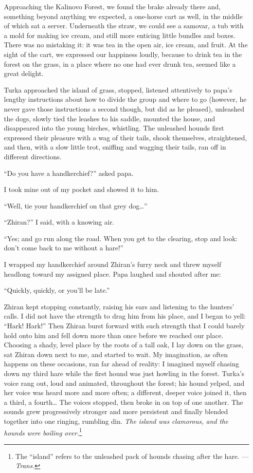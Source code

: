 Approaching the Kalinovo Forest, we found the brake already there and, something beyond anything we expected, a one-horse cart as well, in the middle of which sat a server. Underneath the straw, we could see a samovar, a tub with a mold for making ice cream, and still more enticing little bundles and boxes. There was no mistaking it: it was tea in the open air, ice cream, and fruit. At the sight of the cart, we expressed our happiness loudly, because to drink tea in the forest on the grass, in a place where no one had ever drunk tea, seemed like a great delight.

Turka approached the island of grass, stopped, listened attentively to papa's lengthy instructions about how to divide the group and where to go (however, he never gave those instructions a second though, but did as he pleased), unleashed the dogs, slowly tied the leashes to his saddle, mounted the house, and disappeared into the young birches, whistling. The unleashed hounds first expressed their pleasure with a wag of their tails, shook themselves, straightened, and then, with a slow little trot, sniffing and wagging their tails, ran off in different directions.

``Do you have a handkerchief?'' asked papa. %

I took mine out of my pocket and showed it to him.

``Well, tie your handkerchief on that grey dog\ldots{}'' %

``Zhiran?'' I said, with a knowing air. %

``Yes; and go run along the road. When you get to the clearing, stop and look: don't come back to me without a hare!'' %

I wrapped my handkerchief around Zhiran's furry neck and threw myself headlong toward my assigned place. Papa laughed and shouted after me:

``Quickly, quickly, or you'll be late.'' %

Zhiran kept stopping constantly, raising his ears and listening to the hunters' calls. I did not have the strength to drag him from his place, and I began to yell: ``Hark! Hark!'' Then Zhiran burst forward with such strength that I could barely hold onto him and fell down more than once before we reached our place. Choosing a shady, level place by the roots of a tall oak, I lay down on the grass, sat Zhiran down next to me, and started to wait. My imagination, as often happens on these occasions, ran far ahead of reality: I imagined myself chasing down my third hare while the first hound was just howling in the forest. Turka's voice rang out, loud and animated, throughout the forest; his hound yelped, and her voice was heard more and more often; a different, deeper voice joined it, then a third, a fourth\ldots{} The voices stopped, then broke in on top of one another. The sounds grew progressively stronger and more persistent and finally blended together into one ringing, rumbling din.  \textit{The island was clamorous, and the hounds were boiling over.}\footnote{The ``island'' refers to the unleashed pack of hounds chasing after the hare. --- \textit{Trans.}}

